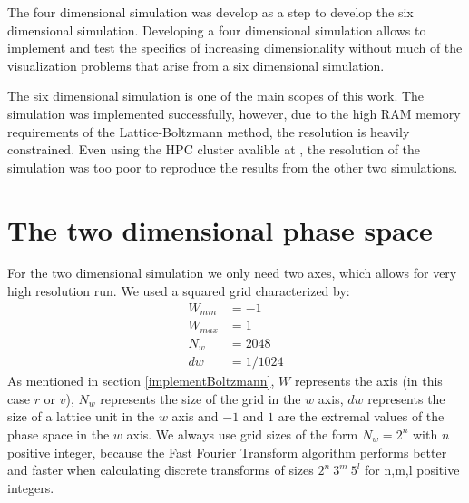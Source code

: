 The four dimensional simulation was develop as a step to develop the six dimensional simulation. Developing a four dimensional simulation allows to implement and test the specifics of increasing dimensionality without much of the visualization problems that arise from a six dimensional simulation. 

The six dimensional simulation is one of the main scopes of this work. The simulation was implemented successfully, however, due to the high RAM memory requirements of the Lattice-Boltzmann method, the resolution is heavily constrained. Even using the HPC cluster avalible at , the resolution of the simulation was too poor to reproduce the results from the other two simulations.

\section{The two dimensional phase space}
\label{primerCaso}

For the two dimensional simulation we only need two axes, which allows for very high resolution run. We used a squared grid characterized by:
\begin{align}
W_{min} &= -1\\
W_{max} &= 1\\
N_w &= 2048\\
dw &= 1/1024
\end{align}
As mentioned in section \ref{implementBoltzmann}, $W$ represents the axis (in this case $r$ or $v$), $N_w$ represents the size of the grid in the $w$ axis, $dw$ represents the size of a lattice unit in the $w$ axis and $-1$ and $1$ are the extremal values of the phase space in the $w$ axis.
We always use grid sizes of the form $N_w = 2^n$ with $n$ positive integer, because the Fast Fourier Transform algorithm performs better and faster when calculating discrete transforms of sizes $2^n \ 3^m \ 5^l$ for n,m,l positive integers.%

